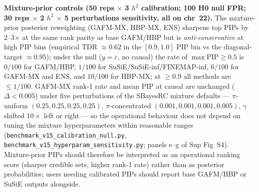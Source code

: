 \textbf{Mixture-prior controls (50 reps $\times$ 3 $h^2$ calibration; 100 H0 null FPR;
30 reps $\times$ 2 $h^2$ $\times$ 5 perturbations sensitivity, all on chr~22).}
The mixture-prior posterior reweighting (GAFM-MX, HBP-MX, ENS) sharpens
top PIPs by 2--3$\times$ at the same rank parity as base GAFM/HBP but is
\emph{anti-conservative} at high PIP bins (empirical TDR $\approx 0.62$
in the $[0.9, 1.0]$ PIP bin vs the diagonal-target $\approx 0.95$);
under the null ($y = \varepsilon$, no causal) the rate of $\max\mathrm{PIP}\geq 0.5$
is $0/100$ for GAFM/HBP, $1/100$ for SuSiE/SuSiE-inf/FINEMAP-inf,
$6/100$ for GAFM-MX and ENS, and $10/100$ for HBP-MX; at $\geq 0.9$ all
methods are $\leq 1/100$. GAFM-MX rank-1 rate and mean PIP at causal are
unchanged ($\Delta < 0.005$) under five perturbations of the SBayesRC
mixture defaults --- $\pi$-uniform $(0.25,0.25,0.25,0.25)$,
$\pi$-concentrated $(0.001,0.001,0.001,0.005)$, $\gamma$ shifted
$10\times$ left or right --- so the operational behaviour does not
depend on tuning the mixture hyperparameters within reasonable ranges
(\texttt{benchmark\_v15\_calibration\_null.py}, \texttt{benchmark\_v15\_hyperparam\_sensitivity.py};
panels e--g of Sup Fig~S4). Mixture-prior PIPs should therefore be
interpreted as an operational ranking score (sharper credible sets,
higher rank-1 rate) rather than as posterior probabilities; users
needing calibrated PIPs should report base GAFM/HBP or SuSiE outputs
alongside.

